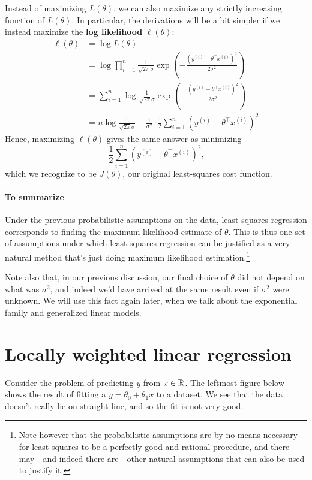 Instead of maximizing $L(\theta)$, we can also maximize any strictly increasing
function of $L(\theta)$. In particular, the derivations will be a bit simpler if we
instead maximize the \textbf{log likelihood} $\ell(\theta)$:
\begin{align*}
    \ell(\theta) &= \log L(\theta) \\
    &= \log \prod_{i=1}^n \frac{1}{\sqrt{2\pi}\sigma} \exp \left( - \frac{(y^{(i)} - \theta^\top x^{(i)})^2}{2\sigma^2} \right) \\
    &= \sum_{i=1}^n \log \frac{1}{\sqrt{2\pi}\sigma} \exp \left( - \frac{(y^{(i)} - \theta^\top x^{(i)})^2}{2\sigma^2} \right) \\
    &= n \log \frac{1}{\sqrt{2\pi}\sigma} - \frac{1}{\sigma^2} \cdot \frac{1}{2} \sum_{i=1}^n \left(y^{(i)} - \theta^\top x^{(i)} \right)^2 %
\end{align*}
Hence, maximizing $\ell(\theta)$ gives the same answer as minimizing
\begin{equation*}
    \frac 1 2 \sum_{i=1}^n \left( y^{(i)} - \theta^\top x^{(i)} \right)^2\text{,}
\end{equation*}
which we recognize to be $J(\theta)$, our original least-squares cost function.

\paragraph{To summarize} Under the previous probabilistic assumptions on the data,
least-squares regression corresponds to finding the maximum likelihood estimate
of $\theta$. This is thus one set of assumptions under which least-squares regression
can be justified as a very natural method that's just doing maximum
likelihood estimation.\footnote{Note however that the probabilistic assumptions are
by no means necessary for least-squares to be a perfectly good and rational
procedure, and there may---and indeed there are---other natural assumptions
that can also be used to justify it.} %

Note also that, in our previous discussion, our final choice of $\theta$ did not
depend on what was $\sigma^2$, and indeed we'd have arrived at the same result
even if $\sigma^2$ were unknown. We will use this fact again later, when we talk
about the exponential family and generalized linear models.


\section{Locally weighted linear regression}
Consider the problem of predicting $y$ from $x \in \mathbb{R}$. The leftmost figure below
shows the result of fitting a $y = \theta_0 + \theta_1 x$ to a dataset. We see that the data
doesn't really lie on straight line, and so the fit is not very good.


